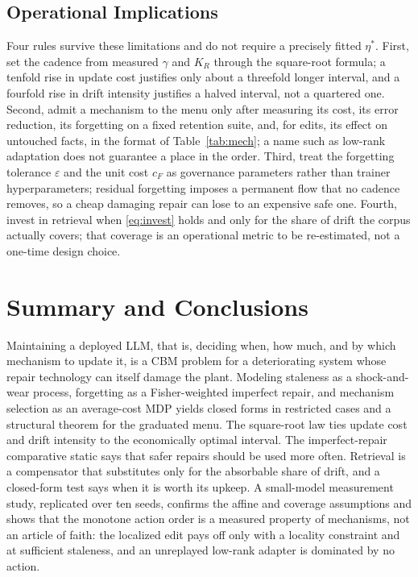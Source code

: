 \documentclass[journal]{IEEEtran}
\newcommand{\eps}{\varepsilon}
\begin{document}
\subsection{Operational Implications}
Four rules survive these limitations and do not require a precisely fitted $\eta^\ast$. First, set the cadence from measured $\gamma$ and $K_R$ through the square-root formula; a tenfold rise in update cost justifies only about a threefold longer interval, and a fourfold rise in drift intensity justifies a halved interval, not a quartered one. Second, admit a mechanism to the menu only after measuring its cost, its error reduction, its forgetting on a fixed retention suite, and, for edits, its effect on untouched facts, in the format of Table~\ref{tab:mech}; a name such as low-rank adaptation does not guarantee a place in the order. Third, treat the forgetting tolerance $\eps$ and the unit cost $c_F$ as governance parameters rather than trainer hyperparameters; residual forgetting imposes a permanent flow that no cadence removes, so a cheap damaging repair can lose to an expensive safe one. Fourth, invest in retrieval when \eqref{eq:invest} holds and only for the share of drift the corpus actually covers; that coverage is an operational metric to be re-estimated, not a one-time design choice.

\section{Summary and Conclusions}\label{sec:concl}
Maintaining a deployed LLM, that is, deciding when, how much, and by which mechanism to update it, is a CBM problem for a deteriorating system whose repair technology can itself damage the plant. Modeling staleness as a shock-and-wear process, forgetting as a Fisher-weighted imperfect repair, and mechanism selection as an average-cost MDP yields closed forms in restricted cases and a structural theorem for the graduated menu. The square-root law ties update cost and drift intensity to the economically optimal interval. The imperfect-repair comparative static says that safer repairs should be used more often. Retrieval is a compensator that substitutes only for the absorbable share of drift, and a closed-form test says when it is worth its upkeep. A small-model measurement study, replicated over ten seeds, confirms the affine and coverage assumptions and shows that the monotone action order is a measured property of mechanisms, not an article of faith: the localized edit pays off only with a locality constraint and at sufficient staleness, and an unreplayed low-rank adapter is dominated by no action.
\end{document}
